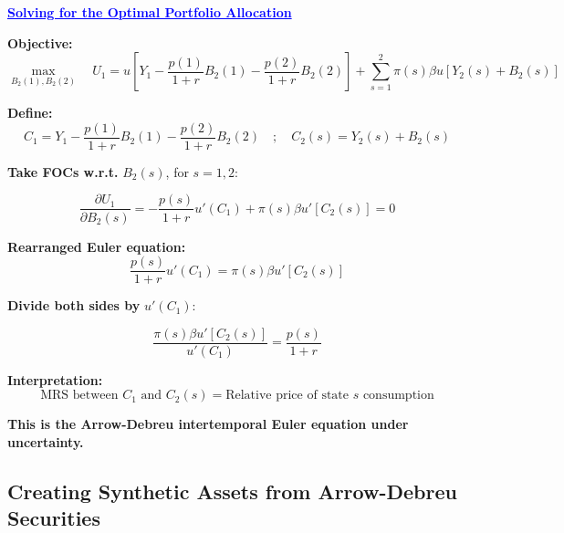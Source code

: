 \documentclass[12pt]{article}
\begin{document}
\textcolor{blue}{\textbf{\uline{Solving for the Optimal Portfolio Allocation}}}

{\color{blue}
\textbf{Objective:}
\[
\max_{B_2(1), B_2(2)} \quad U_1 = u\left[ Y_1 - \frac{p(1)}{1 + r} B_2(1) - \frac{p(2)}{1 + r} B_2(2) \right] + \sum_{s=1}^2 \pi(s) \beta u[Y_2(s) + B_2(s)]
\]

\textbf{Define:}
\[
C_1 = Y_1 - \frac{p(1)}{1 + r} B_2(1) - \frac{p(2)}{1 + r} B_2(2)
\quad ; \quad
C_2(s) = Y_2(s) + B_2(s)
\]

\textbf{Take FOCs w.r.t. } \( B_2(s) \), for \( s = 1, 2 \):

\[
\frac{\partial U_1}{\partial B_2(s)} =
- \frac{p(s)}{1 + r} u'(C_1) + \pi(s) \beta u'[C_2(s)] = 0
\]

\textbf{Rearranged Euler equation:}
\[
\frac{p(s)}{1 + r} u'(C_1) = \pi(s) \beta u'[C_2(s)] \tag{5}
\]

\textbf{Divide both sides by } \( u'(C_1) \):

\[
\frac{\pi(s) \beta u'[C_2(s)]}{u'(C_1)} = \frac{p(s)}{1 + r} \tag{6}
\]

\textbf{Interpretation:}
\[
\text{MRS between } C_1 \text{ and } C_2(s) = \text{Relative price of state } s \text{ consumption}
\]

\textbf{This is the Arrow-Debreu intertemporal Euler equation under uncertainty.}
}

\subsection*{\noindent\textbf{Creating Synthetic Assets from Arrow-Debreu Securities}}
\end{document}
